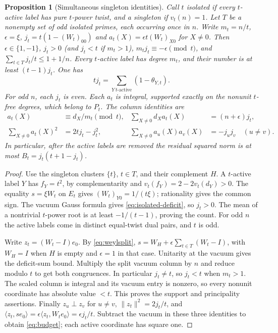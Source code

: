 \documentclass[11pt,a4paper]{article}
\numberwithin{equation}{section}
\newtheorem{proposition}[theorem]{Proposition}
\theoremstyle{remark}
\begin{document}
\begin{proposition}[Simultaneous singleton identities]\label{fam:M:6.3}\label{second:two-columns}
Call $t$ \emph{isolated} if every $t$-active label has pure $t$-power
twist, and a \emph{singleton} if $v_t(n)=1$. Let $T$ be a nonempty
set of odd isolated primes, each occurring
once in $n$. Write $m_t=n/t$, $\epsilon=\xi$,
$j_t=t(1-(W_t)_{00})$ and $a_t(X)=\epsilon t(W_t)_{X0}$ for $X\ne0$.
Then $\epsilon\in\{1,-1\}$, $j_t>0$ (and $j_t<t$ if $m_t>1$),
$m_tj_t\equiv-\epsilon\pmod t$, and
$\sum_{t\in T}j_t/t\le1+1/n$.
Every $t$-active label has degree $m_t$, and their number is at least
$(t-1)j_t$. One has
\begin{equation}\label{eq:isolated-deficit}
 tj_t=\sum_{Y\ t\text{-active}}(1-\theta_{Y,t}).
\end{equation}
For odd $n$, each $j_t$ is even. Each $a_t$ is integral, supported
exactly on the nonunit $t$-free degrees, which belong to $P_t$. The
column identities are
\begin{align}
 a_t(X)&\equiv d_X/m_t\pmod t,&
 \sum_{X\ne0} d_Xa_t(X)&=(n+\epsilon)j_t,\nonumber\\
 \sum_{X\ne0}a_t(X)^2&=2tj_t-j_t^2,&
 \sum_{X\ne0}a_u(X)a_v(X)&=-j_uj_v\quad(u\ne v).\label{eq:budget}
\end{align}
In particular, after the active labels are removed the residual
squared norm is at most $B_t=j_t(t+1-j_t)$.
\end{proposition}
\begin{proof}
Use the singleton clusters $\{t\}$, $t\in T$, and their complement $H$. A $t$-active label $Y$ has
$f_Y=t^2$, by complementarity and $v_t(f_Y)=2-2v_t(d_Y)>0$.
The equality $s=\xi W_t$ on $E_t$ gives $(W_t)_{Y0}=1/(t\xi)$;
rationality gives the common sign. The vacuum Gauss formula gives
\eqref{eq:isolated-deficit}, so $j_t>0$. The mean of a nontrivial
$t$-power root is at least $-1/(t-1)$, proving the count. For odd
$n$ the active labels come in distinct equal-twist dual pairs, and
$t$ is odd.

Write $z_t=(W_t-I)e_0$. By \eqref{eq:weylsplit},
$s=W_H+\epsilon\sum_{t\in T}(W_t-I)$, with $W_H=I$ when $H$ is
empty and $\epsilon=1$ in that case. Unitarity at the vacuum gives
the deficit-sum bound. Multiply the split vacuum column by $n$ and
reduce modulo $t$ to get both congruences. In particular $j_t\ne t$,
so $j_t<t$ when $m_t>1$. The scaled column is integral and its vacuum
entry is nonzero, so every nonunit coordinate has absolute value $<t$. This proves the
support and principality assertions. Finally $z_u\perp z_v$ for
$u\ne v$, $\|z_t\|^2=2j_t/t$, and
$\langle z_t,se_0\rangle=\epsilon\langle z_t,W_te_0\rangle
=\epsilon j_t/t$. Subtract the vacuum in these three identities to
obtain \eqref{eq:budget}; each active coordinate has square one.
\end{proof}
\end{document}
